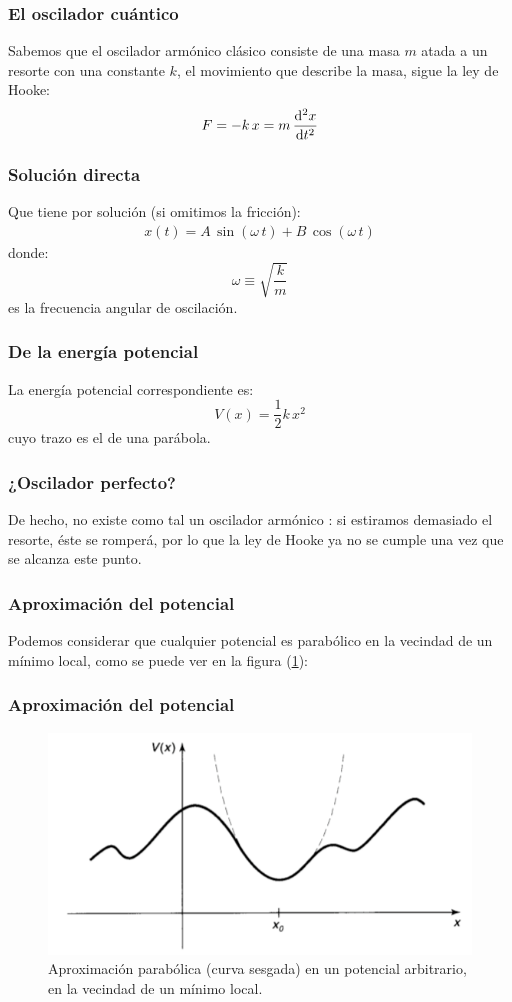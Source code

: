 \documentclass[12pt]{beamer}
\begin{document}
\begin{frame}
\frametitle{El oscilador cuántico}
Sabemos que el oscilador armónico clásico consiste de una masa $m$ atada a un resorte con una constante $k$, el movimiento que describe la masa, sigue la ley de Hooke:
\pause
\begin{align*}
F = - k \, x = m \, \dv[2]{x}{t}
\end{align*}
\end{frame}
\begin{frame}
\frametitle{Solución directa}
Que tiene por solución (si omitimos la fricción):
\pause
\begin{align*}
x (t) = A \, \sin (\omega \, t) + B \, \cos (\omega \, t)
\end{align*}
\pause
donde:
\pause
\begin{equation}
\omega \equiv \sqrt{\dfrac{k}{m}}
\label{eq:ecuacion_02_036}
\end{equation}
es la frecuencia angular de oscilación.
\end{frame}
\begin{frame}
\frametitle{De la energía potencial}
La energía potencial correspondiente es:
\pause
\begin{equation}
V (x) = \dfrac{1}{2} k \, x^{2}
\label{eq:ecuacion_02_037}
\end{equation}
cuyo trazo es el de una parábola.
\end{frame}
\begin{frame}
\frametitle{¿Oscilador perfecto?}
De hecho, no existe como tal un oscilador armónico : \pause si estiramos demasiado el resorte, éste se romperá, por lo que la ley de Hooke ya no se cumple una vez que se alcanza este punto.
\end{frame}
\begin{frame}
\frametitle{Aproximación del potencial}
Podemos considerar que cualquier potencial es  parabólico en la vecindad de un mínimo local, como se puede ver en la figura (\ref{fig:figura_001}):
\end{frame}
\begin{frame}
\frametitle{Aproximación del potencial}
\begin{figure}[H]
    \centering
    \includegraphics[scale=0.4]{Imagenes/Potencial_arbitrario.png}
    \caption{Aproximación parabólica (curva sesgada) en un potencial arbitrario, en la vecindad de un mínimo local.}
    \label{fig:figura_001}
\end{figure}
\end{frame}
\end{document}
